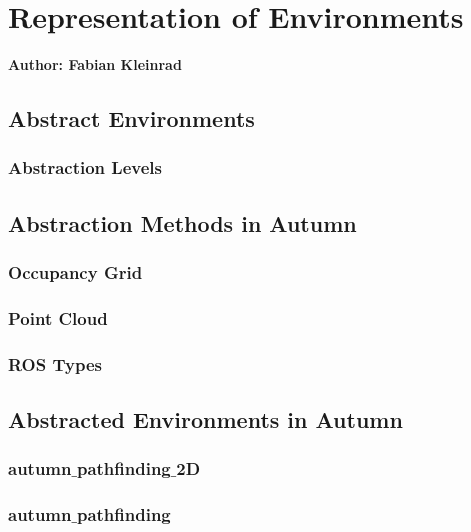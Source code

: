 \chapter{Representation of Environments}

\textbf{Author: Fabian Kleinrad} 

\section{Abstract Environments}

\subsection{Abstraction Levels}

\section{Abstraction Methods in Autumn}

\subsection{Occupancy Grid}

\subsection{Point Cloud}

\subsection{ROS Types}

\section{Abstracted Environments in Autumn}

\subsection{autumn$\_$pathfinding$\_$2D}

\subsection{autumn$\_$pathfinding}